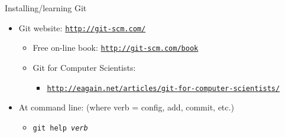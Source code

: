 \documentclass[aspectratio=169,11pt,t]{beamer}
\newcommand{\cmd}[1]{\textcolor{cmdcol}{\texttt{#1}}}    %
\newcommand{\ph}[1]{\textit{#1}}                         %
\newcommand{\link}[1]{\textcolor{linkcol}{\underline{\texttt{#1}}}}
\begin{document}
\begin{frame}{Installing/learning Git}
  \vskip3mm
  \begin{itemize}
    \item Git website: \link{http://git-scm.com/}
      \begin{itemize}
        \item Free on-line book: \link{http://git-scm.com/book}
        \item Git for Computer Scientists:
          \begin{itemize}
            \item \link{http://eagain.net/articles/git-for-computer-scientists/}
          \end{itemize}
      \end{itemize}
    \vskip2mm
    \item At command line: (where verb = config, add, commit, etc.)
      \begin{itemize}
        \item \cmd{git help \ph{verb}}
      \end{itemize}
  \end{itemize}
\end{frame}
\end{document}
